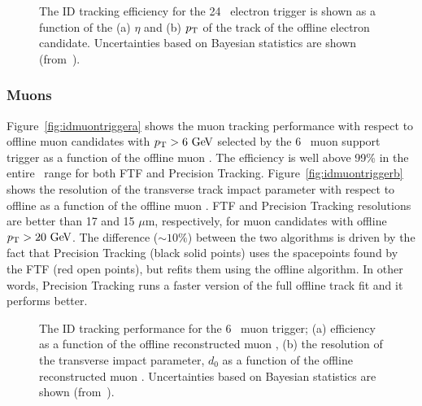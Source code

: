 				\begin{figure}[!htb]
					\centering
					\caption{The ID tracking efficiency for the 24 \GeV\ electron trigger is shown as a function of the (a) $\eta$ and (b) $p_{\mathrm{T}}$ of the track of the offline electron candidate. Uncertainties based on Bayesian statistics are shown (from~\cite{ATLASTrigger2015}).}
					\label{fig:ele_idtrig_eff}
				\end{figure}

			\subsubsection*{Muons}

				Figure~\ref{fig:idmuontriggera} shows the muon tracking performance with respect to offline muon candidates with $\pt > 6 \GeV$ selected by the 6 \GeV\ muon support trigger as a function of the offline muon \pt. The efficiency is well above 99\% in the entire \pt\ range for both FTF and Precision Tracking. Figure~\ref{fig:idmuontriggerb} shows the resolution of the transverse track impact parameter with respect to offline as a function of the offline muon \pt. FTF and Precision Tracking resolutions are better than 17 and 15 $\mu$m, respectively, for muon candidates with offline $\pt > 20 \GeV$. The difference ($\sim 10\%$) between the two algorithms is driven by the fact that Precision Tracking (black solid points) uses the spacepoints found by the FTF (red open points), but refits them using the offline algorithm. In other words, Precision Tracking runs a faster version of the full offline track fit and it performs better.

				\begin{figure}[!htb]
					\centering
					\caption{ 
					The ID tracking performance for the 6 \GeV\ muon trigger;
					(a) efficiency as a function of the offline reconstructed muon \pt,  
					(b) the resolution of the transverse impact parameter, $d_{0}$  as a function of the offline reconstructed muon \pt. Uncertainties based on Bayesian statistics are shown (from~\cite{ATLASTrigger2015}).}
				\label{fig:idmuontrigger}
				\end{figure}



